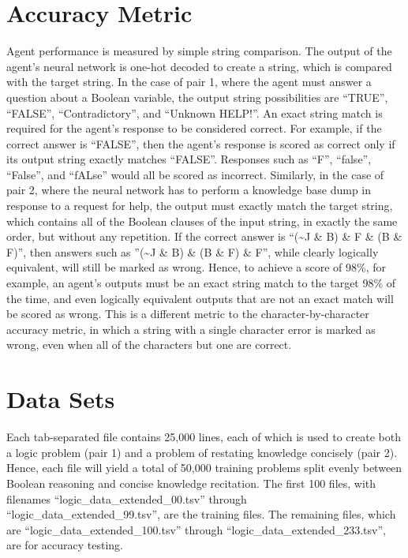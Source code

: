 \documentclass[
]{article}
\begin{document}
\hypertarget{accuracy-metric}{%
\section{Accuracy Metric}\label{accuracy-metric}}

Agent performance is measured by simple string comparison. The output of
the agent's neural network is one-hot decoded to create a string, which
is compared with the target string. In the case of pair 1, where the
agent must answer a question about a Boolean variable, the output string
possibilities are ``TRUE'', ``FALSE'', ``Contradictory'', and ``Unknown
HELP!''. An exact string match is required for the agent's response to
be considered correct. For example, if the correct answer is ``FALSE'',
then the agent's response is scored as correct only if its output string
exactly matches ``FALSE''. Responses such as ``F'', ``false'',
``False'', and ``fALse'' would all be scored as incorrect. Similarly, in
the case of pair 2, where the neural network has to perform a knowledge
base dump in response to a request for help, the output must exactly
match the target string, which contains all of the Boolean clauses of
the input string, in exactly the same order, but without any repetition.
If the correct answer is ``(\textasciitilde J \& B) \& F \& (B \& F)'',
then answers such as ''(\textasciitilde J \& B) \& (B \& F) \& F'',
while clearly logically equivalent, will still be marked as wrong.
Hence, to achieve a score of 98\%, for example, an agent's outputs must
be an exact string match to the target 98\% of the time, and even
logically equivalent outputs that are not an exact match will be scored
as wrong. This is a different metric to the character-by-character
accuracy metric, in which a string with a single character error is
marked as wrong, even when all of the characters but one are correct.

\hypertarget{data-sets}{%
\section{Data Sets}\label{data-sets}}

Each tab-separated file contains 25,000 lines, each of which is used to
create both a logic problem (pair 1) and a problem of restating
knowledge concisely (pair 2). Hence, each file will yield a total of
50,000 training problems split evenly between Boolean reasoning and
concise knowledge recitation. The first 100 files, with filenames
``logic\_data\_extended\_00.tsv'' through
``logic\_data\_extended\_99.tsv'', are the training files. The remaining
files, which are ``logic\_data\_extended\_100.tsv'' through
``logic\_data\_extended\_233.tsv'', are for accuracy testing.
\end{document}
